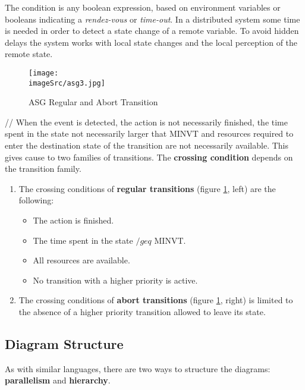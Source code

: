 \documentclass[../main.tex]{subfiles}
\renewcommand{\imageSrc}{../images/}
\begin{document}
The condition is any boolean expression, based on environment variables or booleans indicating a \textit{rendez-vous} or \textit{time-out}. In a distributed system some time is needed in order to detect a state change of a remote variable. To avoid hidden delays the system works with local state changes and the local perception of the remote state. 
\begin{figure}[H]
    \centering
    \texttt{[image: \\imageSrc/asg3.jpg]}
    \caption{ASG Regular and Abort Transition}
    \label{asg3}
\end{figure}
//
When the event is detected, the action is not necessarily finished, the time spent in the state not necessarily larger that MINVT and resources required to enter the destination state of the transition are not necessarily available. This gives cause to two families of transitions. The \textbf{crossing condition} depends on the transition family.
\begin{enumerate}
	\item  The crossing conditions of \textbf{regular transitions} (figure \ref{asg3}, left) are the following:
	\begin{itemize}
		\item The action is finished.
		\item The time spent in the state $/geq$ MINVT.
		\item All resources are available.
		\item No transition with a higher priority is active.
	\end{itemize}
	\item The crossing conditions of \textbf{abort transitions} (figure \ref{asg3}, right) is limited to the absence of a higher priority transition allowed to leave its state.
\end{enumerate}

\subsection{Diagram Structure}
As with similar languages, there are two ways to structure the diagrams: \textbf{parallelism} and \textbf{hierarchy}.
\end{document}
